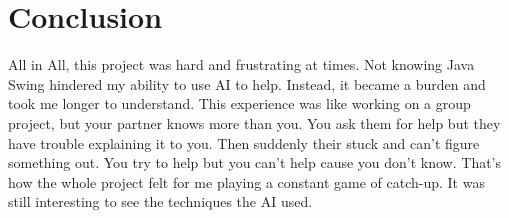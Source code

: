 \documentclass[a4paper,11pt]{article}
\begin{document}
\section*{Conclusion}
All in All, this project was hard and frustrating at times. Not knowing Java Swing hindered my ability to use AI to help. Instead, it became a burden and took me longer to understand. This experience was like working on a group project, but your partner knows more than you. You ask them for help but they have trouble explaining it to you. Then suddenly their stuck and can't figure something out. You try to help but you can't help cause you don't know. That's how the whole project felt for me playing a constant game of catch-up. It was still interesting to see the techniques the AI used. 
\end{document}
